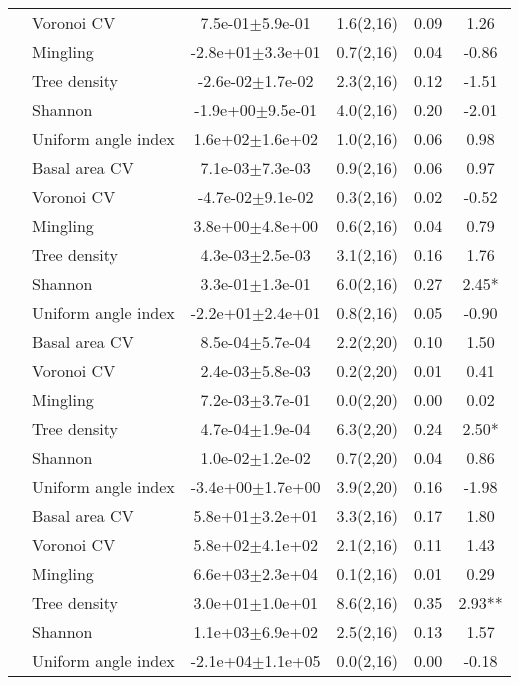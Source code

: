 \begin{longtable}{llcccS[table-format=-2.2, table-space-text-post = {***}]}
   & Voronoi CV &  7.5e-01$\pm$5.9e-01 & 1.6(2,16) & 0.09 & 1.26 \\* 
   & Mingling & -2.8e+01$\pm$3.3e+01 & 0.7(2,16) & 0.04 & -0.86 \\* 
   & Tree density & -2.6e-02$\pm$1.7e-02 & 2.3(2,16) & 0.12 & -1.51 \\* 
   & Shannon & -1.9e+00$\pm$9.5e-01 & 4.0(2,16) & 0.20 & -2.01 \\* 
   & Uniform angle index &  1.6e+02$\pm$1.6e+02 & 1.0(2,16) & 0.06 & 0.98 \\ 
   \midrule
{} & Basal area CV &  7.1e-03$\pm$7.3e-03 & 0.9(2,16) & 0.06 & 0.97 \\* 
   & Voronoi CV & -4.7e-02$\pm$9.1e-02 & 0.3(2,16) & 0.02 & -0.52 \\* 
   & Mingling &  3.8e+00$\pm$4.8e+00 & 0.6(2,16) & 0.04 & 0.79 \\* 
   & Tree density &  4.3e-03$\pm$2.5e-03 & 3.1(2,16) & 0.16 & 1.76 \\* 
   & Shannon &  3.3e-01$\pm$1.3e-01 & 6.0(2,16) & 0.27 & 2.45* \\* 
   & Uniform angle index & -2.2e+01$\pm$2.4e+01 & 0.8(2,16) & 0.05 & -0.90 \\ 
   \midrule
{} & Basal area CV &  8.5e-04$\pm$5.7e-04 & 2.2(2,20) & 0.10 & 1.50 \\* 
   & Voronoi CV &  2.4e-03$\pm$5.8e-03 & 0.2(2,20) & 0.01 & 0.41 \\* 
   & Mingling &  7.2e-03$\pm$3.7e-01 & 0.0(2,20) & 0.00 & 0.02 \\* 
   & Tree density &  4.7e-04$\pm$1.9e-04 & 6.3(2,20) & 0.24 & 2.50* \\* 
   & Shannon &  1.0e-02$\pm$1.2e-02 & 0.7(2,20) & 0.04 & 0.86 \\* 
   & Uniform angle index & -3.4e+00$\pm$1.7e+00 & 3.9(2,20) & 0.16 & -1.98 \\ 
   \midrule
{} & Basal area CV &  5.8e+01$\pm$3.2e+01 & 3.3(2,16) & 0.17 & 1.80 \\* 
   & Voronoi CV &  5.8e+02$\pm$4.1e+02 & 2.1(2,16) & 0.11 & 1.43 \\* 
   & Mingling &  6.6e+03$\pm$2.3e+04 & 0.1(2,16) & 0.01 & 0.29 \\* 
   & Tree density &  3.0e+01$\pm$1.0e+01 & 8.6(2,16) & 0.35 & 2.93** \\* 
   & Shannon &  1.1e+03$\pm$6.9e+02 & 2.5(2,16) & 0.13 & 1.57 \\* 
   & Uniform angle index & -2.1e+04$\pm$1.1e+05 & 0.0(2,16) & 0.00 & -0.18 \\ 

\end{longtable}
